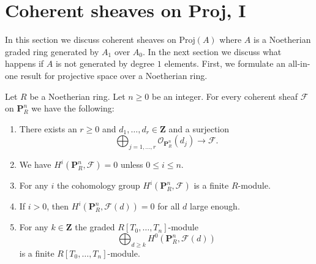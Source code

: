 \section{Coherent sheaves on Proj, I}
\label{section-coherent-proj}

\noindent
In this section we discuss coherent sheaves on $\text{Proj}(A)$
where $A$ is a Noetherian graded ring generated by $A_1$ over $A_0$.
In the next section we discuss what happens if $A$ is not generated
by degree $1$ elements. First, we formulate an all-in-one result for
projective space over a Noetherian ring.

\begin{lemma}
\label{lemma-coherent-projective}
Let $R$ be a Noetherian ring.
Let $n \geq 0$ be an integer.
For every coherent sheaf $\mathcal{F}$ on $\mathbf{P}^n_R$
we have the following:
\begin{enumerate}
\item There exists an $r \geq 0$ and
$d_1, \ldots, d_r \in \mathbf{Z}$ and a surjection
$$
\bigoplus\nolimits_{j = 1, \ldots, r}
\mathcal{O}_{\mathbf{P}^n_R}(d_j)
\longrightarrow
\mathcal{F}.
$$
\item We have $H^i(\mathbf{P}^n_R, \mathcal{F}) = 0$ unless
$0 \leq i \leq n$.
\item For any $i$ the cohomology group $H^i(\mathbf{P}^n_R, \mathcal{F})$
is a finite $R$-module.
\item If $i > 0$, then
$H^i(\mathbf{P}^n_R, \mathcal{F}(d)) = 0$ for all $d$ large enough.
\item For any $k \in \mathbf{Z}$ the graded $R[T_0, \ldots, T_n]$-module
$$
\bigoplus\nolimits_{d \geq k} H^0(\mathbf{P}^n_R, \mathcal{F}(d))
$$
is a finite $R[T_0, \ldots, T_n]$-module.
\end{enumerate}
\end{lemma}

